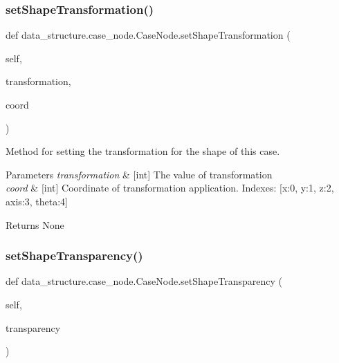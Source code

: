 \subsubsection{\texorpdfstring{set\+Shape\+Transformation()}{setShapeTransformation()}}
{\footnotesize\ttfamily def data\+\_\+structure.\+case\+\_\+node.\+Case\+Node.\+set\+Shape\+Transformation (\begin{DoxyParamCaption}\item[{}]{self,  }\item[{}]{transformation,  }\item[{}]{coord }\end{DoxyParamCaption})}



Method for setting the transformation for the shape of this case. 


\begin{DoxyParams}{Parameters}
{\em transformation} & \mbox{[}int\mbox{]} The value of transformation \\
\hline
{\em coord} & \mbox{[}int\mbox{]} Coordinate of transformation application. Indexes\+: \mbox{[}x\+:0, y\+:1, z\+:2, axis\+:3, theta\+:4\mbox{]}\\
\hline
\end{DoxyParams}
\begin{DoxyReturn}{Returns}
None 
\end{DoxyReturn}
\hypertarget{classdata__structure_1_1case__node_1_1_case_node_ac24fbc54a83a04a8ea3d20f058b3a196}{}\label{classdata__structure_1_1case__node_1_1_case_node_ac24fbc54a83a04a8ea3d20f058b3a196} 
\subsubsection{\texorpdfstring{set\+Shape\+Transparency()}{setShapeTransparency()}}
{\footnotesize\ttfamily def data\+\_\+structure.\+case\+\_\+node.\+Case\+Node.\+set\+Shape\+Transparency (\begin{DoxyParamCaption}\item[{}]{self,  }\item[{}]{transparency }\end{DoxyParamCaption})}



